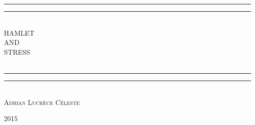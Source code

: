 \newcommand*{\titleGP}{\begingroup %
\centering %
\vspace*{\baselineskip} %

\rule{\textwidth}{1.6pt}\vspace*{-\baselineskip}\vspace*{2pt} %
\rule{\textwidth}{0.4pt}\\[\baselineskip] %

{\LARGE HAMLET\\ AND \\[0.3\baselineskip] STRESS}\\~\\[0.2\baselineskip] %

\rule{\textwidth}{0.4pt}\vspace*{-\baselineskip}\vspace{3.2pt} %
\rule{\textwidth}{1.6pt}\\[\baselineskip] %

\scshape %
Adrian Lucr\`{e}ce C\'{e}leste
\vspace*{2\baselineskip} %


\vfill %

\scshape 2015\\[0.3\baselineskip] %

\endgroup}


\thispagestyle{empty} %

\titleGP{} %

